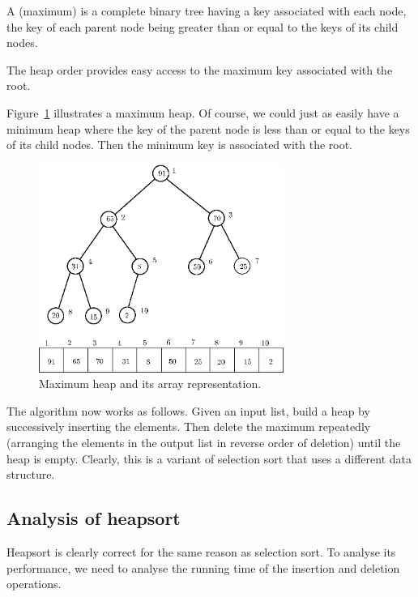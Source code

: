 \begin{Definition}
A (maximum)  is a complete binary tree
having a key associated with each node,
the key of each parent node being greater than or
equal to the keys of its child nodes. 
\end{Definition} 

The heap order provides easy access to the maximum key  
associated with the root.

\begin{Example}
Figure~\ref{heap-fig} illustrates a maximum heap. Of
course, we could just as easily have a minimum heap  where
the key of the parent node is less than or equal to the keys
of its child nodes. Then the minimum key is associated with
the root. 
\end{Example}

\begin{figure}[htbp]
\begin{center}
\includegraphics[width=80mm]{figs/heapmjd2ipe.eps}
\caption{\label{heap-fig} Maximum heap and its array representation.}
\end{center}
\end{figure}

The  algorithm now works as follows. Given an input list, 
build a heap by successively inserting the elements. Then delete the maximum 
repeatedly (arranging the elements in the output list in reverse order of 
deletion) until the heap is empty. Clearly, this is a variant of selection 
sort that uses a different data structure.

\subsection*{Analysis of heapsort}

Heapsort is clearly correct for the same reason as selection sort. To analyse its
performance, we need to analyse the running time of the insertion and deletion 
operations.


